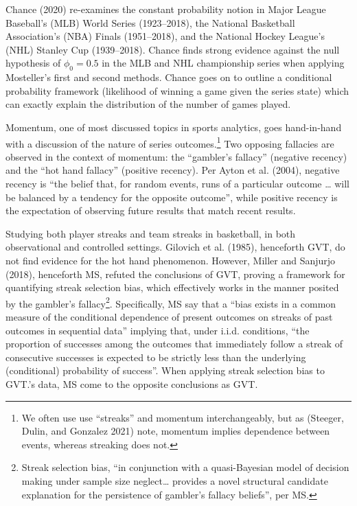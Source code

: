 \documentclass{article}
\begin{document}
Chance (2020) re-examines the constant probability notion in Major
League Baseball's (MLB) World Series (1923--2018), the National
Basketball Association's (NBA) Finals (1951--2018), and the National
Hockey League's (NHL) Stanley Cup (1939--2018). Chance finds strong
evidence against the null hypothesis of \(\phi_0 = 0.5\) in the MLB and
NHL championship series when applying Mosteller's first and second
methods. Chance goes on to outline a conditional probability framework
(likelihood of winning a game given the series state) which can exactly
explain the distribution of the number of games played.

Momentum, one of most discussed topics in sports analytics, goes
hand-in-hand with a discussion of the nature of series
outcomes.\footnote{We often use use ``streaks'' and momentum
  interchangeably, but as (Steeger, Dulin, and Gonzalez 2021) note,
  momentum implies dependence between events, whereas streaking does
  not.} Two opposing fallacies are observed in the context of momentum:
the ``gambler's fallacy'' (negative recency) and the ``hot hand
fallacy'' (positive recency). Per Ayton et al. (2004), negative recency
is ``the belief that, for random events, runs of a particular outcome
\ldots{} will be balanced by a tendency for the opposite outcome'',
while positive recency is the expectation of observing future results
that match recent results.

Studying both player streaks and team streaks in basketball, in both
observational and controlled settings. Gilovich et al. (1985),
henceforth GVT, do not find evidence for the hot hand phenomenon.
However, Miller and Sanjurjo (2018), henceforth MS, refuted the
conclusions of GVT, proving a framework for quantifying streak selection
bias, which effectively works in the manner posited by the gambler's
fallacy\footnote{Streak selection bias, ``in conjunction with a
  quasi-Bayesian model of decision making under sample size
  neglect\ldots{} provides a novel structural candidate explanation for
  the persistence of gambler's fallacy beliefs'', per MS.}.
Specifically, MS say that a ``bias exists in a common measure of the
conditional dependence of present outcomes on streaks of past outcomes
in sequential data'' implying that, under i.i.d. conditions, ``the
proportion of successes among the outcomes that immediately follow a
streak of consecutive successes is expected to be strictly less than the
underlying (conditional) probability of success''. When applying streak
selection bias to GVT.'s data, MS come to the opposite conclusions as
GVT.
\end{document}
